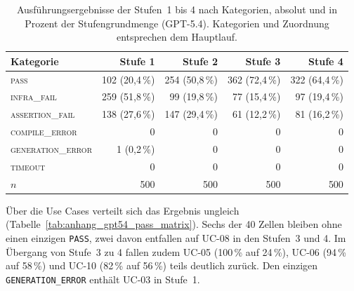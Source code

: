 \begin{table}[H]
    \centering
    \caption[Ausführungsergebnisse je Stufe (GPT-5.4)]{Ausführungsergebnisse der Stufen~1 bis 4 nach Kategorien, absolut und in Prozent der Stufengrundmenge (GPT-5.4). Kategorien und Zuordnung entsprechen dem Hauptlauf.}
    \label{tab:anhang_gpt54_phase1_kategorien}
    \begin{tabular}{lrrrr}
        \toprule
        Kategorie & Stufe 1 & Stufe 2 & Stufe 3 & Stufe 4 \\
        \midrule
        \textsc{pass}              & 102 (20{,}4\,\%) & 254 (50{,}8\,\%) & 362 (72{,}4\,\%) & 322 (64{,}4\,\%) \\
        \textsc{infra\_fail}       & 259 (51{,}8\,\%) & 99 (19{,}8\,\%)  & 77 (15{,}4\,\%)  & 97 (19{,}4\,\%)  \\
        \textsc{assertion\_fail}   & 138 (27{,}6\,\%) & 147 (29{,}4\,\%) & 61 (12{,}2\,\%)  & 81 (16{,}2\,\%)  \\
        \textsc{compile\_error}    & 0                & 0                & 0                & 0                \\
        \textsc{generation\_error} & 1 (0{,}2\,\%)    & 0                & 0                & 0                \\
        \textsc{timeout}           & 0                & 0                & 0                & 0                \\
        \midrule
        $n$                        & 500              & 500              & 500              & 500              \\
        \bottomrule
    \end{tabular}
\end{table}

Über die Use Cases verteilt sich das Ergebnis ungleich (Tabelle~\ref{tab:anhang_gpt54_pass_matrix}). Sechs der 40 Zellen bleiben ohne einen einzigen \texttt{PASS}, zwei davon entfallen auf UC-08 in den Stufen~3 und 4. Im Übergang von Stufe~3 zu 4 fallen zudem UC-05 (100\,\% auf 24\,\%), UC-06 (94\,\% auf 58\,\%) und UC-10 (82\,\% auf 56\,\%) teils deutlich zurück. Den einzigen \texttt{GENERATION\_ERROR} enthält UC-03 in Stufe~1.

